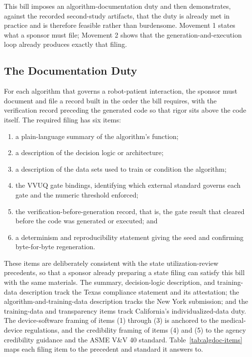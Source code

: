
This bill imposes an algorithm-documentation duty and then demonstrates, against
the recorded second-study artifacts, that the duty is already met in practice and
is therefore feasible rather than burdensome. Movement 1 states what a sponsor
must file; Movement 2 shows that the generation-and-execution loop already
produces exactly that filing.

\subsection{The Documentation Duty}

For each algorithm that governs a robot-patient interaction, the sponsor must
document and file a record built in the order the bill requires, with the
verification record preceding the generated code so that rigor sits above the
code itself. The required filing has six items:

\begin{enumerate}[label=(\arabic*)]
\item a plain-language summary of the algorithm's function;
\item a description of the decision logic or architecture;
\item a description of the data sets used to train or condition the algorithm;
\item the VVUQ gate bindings, identifying which external standard governs each
gate and the numeric threshold enforced;
\item the verification-before-generation record, that is, the gate result that
cleared before the code was generated or executed; and
\item a determinism and reproducibility statement giving the seed and confirming
byte-for-byte regeneration.
\end{enumerate}

These items are deliberately consistent with the state utilization-review
precedents, so that a sponsor already preparing a state filing can satisfy this
bill with the same materials. The summary, decision-logic description, and
training-data description track the Texas compliance statement and its
attestation; the algorithm-and-training-data description tracks the New York
submission; and the training-data and transparency items track California's
individualized-data duty. The device-software framing of items (1) through (3) is
anchored to the medical-device regulations, and the credibility framing of items
(4) and (5) to the agency credibility guidance and the ASME V\&V 40 standard.
Table~\ref{tab:algdoc-items} maps each filing item to the precedent and standard
it answers to.

